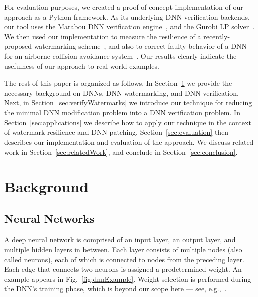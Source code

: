 \documentclass{easychair}
\begin{document}
\medskip

For evaluation purposes, we created a proof-of-concept implementation
of our approach as a Python framework. As its underlying DNN
verification backends, our
tool uses the Marabou DNN verification
engine~\cite{KaHuIbJuLaLiShThWuZeDiKoBa19Marabou}, and the Gurobi LP
solver~\cite{gurobi}. We then used our implementation to measure the resilience
of a recently-proposed watermarking
scheme~\cite{AdBaPiKeWatermarking}, and also to correct faulty
behavior of a DNN for an airborne collision avoidance
system~\cite{JuLoBrOwKo16,KaBaDiJuKo17Reluplex}. Our results clearly
indicate the usefulness of our approach to real-world examples.

The rest of this paper is organized as follows. In
Section~\ref{sec:background} we provide the necessary background on
DNNs, DNN watermarking, and DNN verification. Next, in
Section~\ref{sec:verifyWatermarks} we introduce our technique for
reducing the minimal DNN modification problem into a DNN verification
problem. In Section~\ref{sec:applications} we describe how to apply 
our technique in the context of watermark resilience and DNN patching.
Section~\ref{sec:evaluation} then describes our implementation and
evaluation of the approach.
We discuss related work in Section~\ref{sec:relatedWork},
and conclude in Section~\ref{sec:conclusion}.

\section{Background}
\label{sec:background}

\subsection{Neural Networks}
A deep neural network is comprised of an input layer, an output layer,
and multiple hidden layers in between. Each layer consists of multiple
nodes (also called neurons), each of which is connected to nodes from
the preceding layer. Each edge that connects two neurons is assigned a
predetermined weight. An example appears in
Fig.~\ref{fig:dnnExample}. Weight selection
is performed during the DNN's training phase, which is beyond our
scope here --- see, e.g.,~\cite{FoBeCu16}. 
\end{document}
